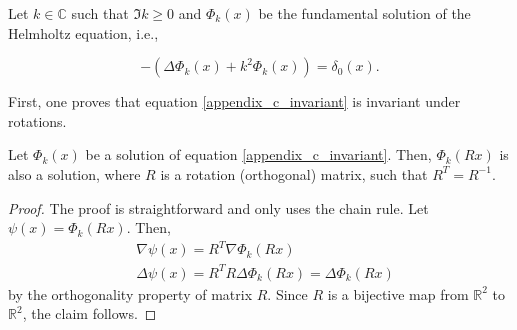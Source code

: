Let \(k \in \mathbb{C}\) such that \(\Im{k} \geq 0\) and \(\Phi_k(x)\) be the fundamental solution of the Helmholtz equation, i.e.,

\begin{equation}\label{appendix_c_invariant}
    -\left(\Delta \Phi_k(x) + k^2 \Phi_k(x)\right) = \delta_0(x).
\end{equation}

First, one proves that equation \eqref{appendix_c_invariant} is invariant under rotations.

\begin{lemma}\label{invariant_lemma}
    Let \(\Phi_k(x)\) be a solution of equation \eqref{appendix_c_invariant}. Then, \(\Phi_k(R x)\) is also a solution, where \(R\) is a rotation (orthogonal) matrix, such that \(R^T = R^{-1}\).
\end{lemma}
\begin{proof}
    The proof is straightforward and only uses the chain rule. Let \(\psi(x) = \Phi_k(Rx)\). Then,
    \begin{align*}
        &\nabla \psi(x) = R^T \nabla \Phi_k(R x)\\
        &\Delta \psi(x) = R^T R \Delta \Phi_k(R x) = \Delta \Phi_k(R x)
    \end{align*}
    by the orthogonality property of matrix \(R\). Since \(R\) is a bijective map from \(\mathbb{R}^2\) to \(\mathbb{R}^2\), the claim follows.
\end{proof}

